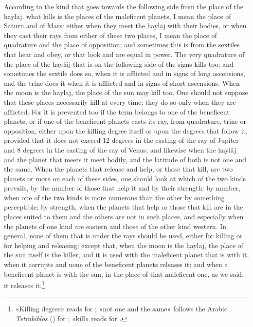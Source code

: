 \documentclass[11pt]{article}
\newcommand{\Fol}[1]{\marginpar{\footnotesize\color{gray}f.\,#1}}
\begin{document}
\par \Fol{48r}According to the kind that goes towards the following side from the place of the haylāj, what kills is the places of the maleficent planets, I mean the place of Saturn and of Mars: either when they meet the haylāj with their bodies, or when they cast their rays from either of these two places, I mean the place of quadrature and the place of opposition; and sometimes this is from the sextiles that hear and obey, or that look and are equal in power. The very quadrature of the place of the haylāj that is on the following side of the signs kills too; and sometimes the sextile does so, when it is afflicted and in signs of long ascensions, and the trine does it when it is afflicted and in signs of short ascensions. When the moon is the haylāj, the place of the sun may kill too. One should not suppose that these places necessarily kill at every time; they do so only when they are afflicted. For it is prevented too if the term belongs to one of the beneficent planets, or if one of the beneficent planets casts its ray, from quadrature, trine or opposition, either upon the killing degree itself or upon the degrees that follow it, provided that it does not exceed 12 degrees in the casting of the ray of Jupiter and 8 degrees in the casting of the ray of Venus; and likewise when the haylāj and the planet that meets it meet bodily, and the latitude of both is not one and the same. When the planets that release and help, or those that kill, are two planets or more on each of these sides, one should look at which of the two kinds prevails, by the number of those that help it and by their strength: by number, when one of the two kinds is more numerous than the other by something perceptible; by strength, when the planets that help or those that kill are in the places suited to them and the others are not in such places, and especially when the planets of one kind are eastern and those of the other kind western. In general, none of them that is under the rays should be used, either for killing or for helping and releasing; except that, when the moon is the haylāj, the place of the sun itself is the killer, and it is used with the maleficent planet that is with it, when it corrupts and none of the beneficent planets releases it; and when a beneficent planet is with the sun, in the place of that maleficent one, as we said, it releases it.\footnote{«Killing degree» reads  for ; «not one and the same» follows the Arabic \emph{Tetrabiblos} () for ; «kill» reads  for .}\par
\end{document}
